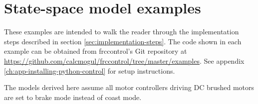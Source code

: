 
\chapter{State-space model examples}

These examples are intended to walk the reader through the implementation steps
described in section \ref{sec:implementation-steps}. The code shown in each
example can be obtained from frccontrol's Git repository at
\url{https://github.com/calcmogul/frccontrol/tree/master/examples}.
See appendix \ref{ch:app-installing-python-control} for setup instructions.

The models derived here assume all motor controllers driving DC brushed motors
are set to brake mode instead of coast mode.







